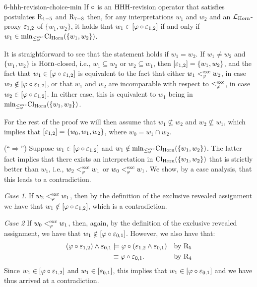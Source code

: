\begin{lem}{}{6-hhh-revision-choice-min}
	If $\circ$ is an ${\mathrm{HHH}}$-revision operator that 
	satisfies postulates $\mathrm{R}_{1-5}$ and $\mathrm{R}_{7-8}$
	then, for any interpretations $w_1$ and $w_2$
	and an $\mathcal{L}_{\mathrm{Horn}}$-proxy $\varepsilon_{1,2}$ of $\{w_1,w_2\}$,
	it holds that $w_1 \in [\varphi\circ\varepsilon_{1,2}]$
	if and only if $w_1\in{\operatorname{min}}_{\le^{{\operatorname{exc}}}_{\varphi}}{\operatorname{Cl}}_{\mathrm{Horn}}(\{w_1,w_2\})$.
\end{lem}
\begin{prf*}{}{}%
	It is straightforward to 
	see that the statement holds if $w_1=w_2$.
	If $w_1\neq w_2$ and 
	$\{w_1,w_2\}$ is $\mathrm{Horn}$-closed,
	i.e., $w_1\subseteq w_2$ or $w_2 \subseteq w_1$,
	then $[\varepsilon_{1,2}]=\{w_1,w_2\}$,
	and the fact that $w_1 \in [\varphi\circ\varepsilon_{1,2}]$
	is equivalent to the fact that either 
	$w_1 <^{{\operatorname{exc}}}_{\varphi} w_2$, 
	in case $w_2\notin[\varphi\circ\varepsilon_{1,2}]$,
	or that $w_1$ and $w_2$ are incomparable with respect to 
	$\le^{{\operatorname{exc}}}_{\varphi}$,
	in case $w_2\in[\varphi\circ\varepsilon_{1,2}]$.
	In either case, this is equivalent to $w_1$
	being in ${\operatorname{min}}_{\le^{{\operatorname{exc}}}_{\varphi}}{\operatorname{Cl}}_{\mathrm{Horn}}(\{w_1,w_2\})$.

	For the rest of the proof we will then assume that
	$w_1\nsubseteq w_2$ and $w_2\nsubseteq w_1$,
	which implies that 
	$[\varepsilon_{1,2}]=\{w_0,w_1,w_2\}$,
	where $w_0 = w_1\cap w_2$.

	(``$\Rightarrow$'')
	Suppose $w_1 \in [\varphi\circ\varepsilon_{1,2}]$
	and
	$w_1\notin{\operatorname{min}}_{\le^{{\operatorname{exc}}}_{\varphi}}{\operatorname{Cl}}_{\mathrm{Horn}}(\{w_1,w_2\})$.
	The latter fact implies that there exists an interpretation in 
	${\operatorname{Cl}}_{\mathrm{Horn}}(\{w_1,w_2\})$ that is strictly better than $w_1$,
	i.e.,  
	$w_2 <^{{\operatorname{exc}}}_{\varphi} w_1$
	or 
	$w_0 <^{{\operatorname{exc}}}_{\varphi} w_1$.
	We show, by a case analysis, that this leads to a contradiction.

	\emph{Case 1}.
	If $w_2 <^{{\operatorname{exc}}}_{\varphi} w_1$,
	then by the definition of the exclusive revealed assignment
	we have that $w_1\notin[\varphi\circ\varepsilon_{1,2}]$,
	which is a contradiction.
	
	\emph{Case 2}
	If $w_0 <^{{\operatorname{exc}}}_{\varphi} w_1$,
	then, again, by the definition of the exclusive revealed assignment,
	we have that $w_1\notin [\varphi\circ\varepsilon_{0,1}]$.
	However, we also have that:
	\begin{align*}
		(\varphi\circ\varepsilon_{1,2})\land\varepsilon_{0,1}&
		\models\varphi\circ(\varepsilon_{1,2}\land\varepsilon_{0,1})&
		\text{by}~\mathrm{R}_{5}\\
						&
		\equiv\varphi\circ\varepsilon_{0,1}.&\text{by}~\mathrm{R}_{4}
	\end{align*}
	Since $w_1\in[\varphi\circ\varepsilon_{1,2}]$ and $w_1\in[\varepsilon_{0,1}]$,
	this implies that $w_1\in[\varphi\circ\varepsilon_{0,1}]$
	and we have thus arrived at a contradiction.


\end{prf*}

